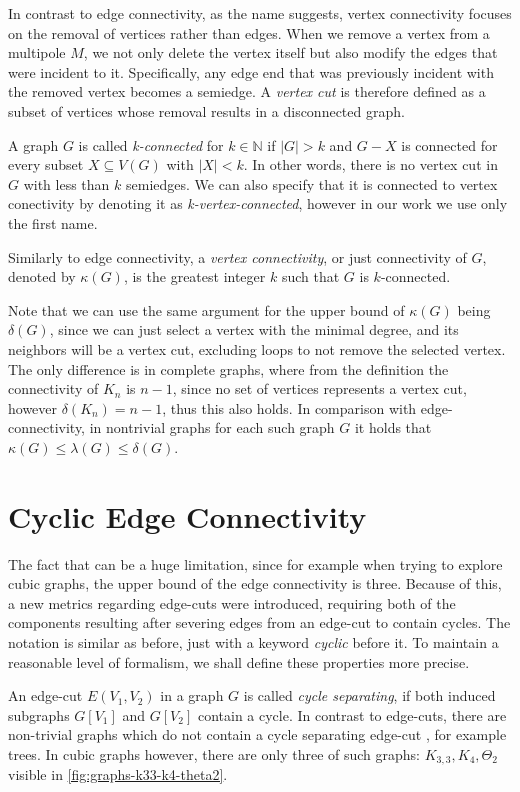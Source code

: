\documentclass[12pt, twoside]{book}
\begin{document}
In contrast to edge connectivity, as the name suggests, vertex connectivity focuses on the removal of vertices rather than edges. When we remove a vertex from a multipole $M$, we not only delete the vertex itself but also modify the edges that were incident to it. Specifically, any edge end that was previously incident with the removed vertex becomes a semiedge. A \textit{vertex cut} is therefore defined as a subset of vertices whose removal results in a disconnected graph.

A graph $G$ is called \textit{k-connected} for $k\in\mathbb{N}$ if $|G|>k$ and $G-X$ is connected for every subset $X\subseteq V(G)$ with $|X|<k$. In other words, there is no vertex cut in $G$ with less than $k$ semiedges. We can also specify that it is connected to vertex conectivity by denoting it as \textit{k-vertex-connected}, however in our work we use only the first name.

Similarly to edge connectivity, a \textit{vertex connectivity}, or just connectivity of $G$, denoted by $\kappa(G)$, is the greatest integer $k$ such that $G$ is $k$-connected.

Note that we can use the same argument for the upper bound of $\kappa(G)$ being $\delta(G)$, since we can just select a vertex with the minimal degree, and its neighbors will be a vertex cut, excluding loops to not remove the selected vertex. The only difference is in complete graphs, where from the definition the connectivity of $K_n$ is $n-1$, since no set of vertices represents a vertex cut, however $\delta(K_n)=n-1$, thus this also holds. In comparison with edge-connectivity, in nontrivial graphs for each such graph $G$ it holds that $\kappa(G)\leq \lambda(G) \leq \delta(G)$.

\section{Cyclic Edge Connectivity}\label{sec:cyclic-edge-connectivity}

The fact that  can be a huge limitation, since for example when trying to explore cubic graphs, the upper bound of the edge connectivity is three. Because of this, a new metrics regarding edge-cuts were introduced, requiring both of the components resulting after severing edges from an edge-cut to contain cycles. The notation is similar as before, just with a keyword \textit{cyclic} before it. To maintain a reasonable level of formalism, we shall define these properties more precise.

An edge-cut $E(V_1,V_2)$ in a graph $G$ is called \textit{cycle separating}, if both induced subgraphs $G[V_1]$ and $G[V_2]$ contain a cycle. In contrast to edge-cuts, there are non-trivial graphs which do not contain a cycle separating edge-cut \cite{atoms-of-cyclic, Lou2008, lovasz1965graphs}, for example trees. In cubic graphs however, there are only three of such graphs: $K_{3,3}, K_4, \Theta_2$ \cite{atoms-of-cyclic} visible in \cref{fig:graphs-k33-k4-theta2}.
\end{document}

